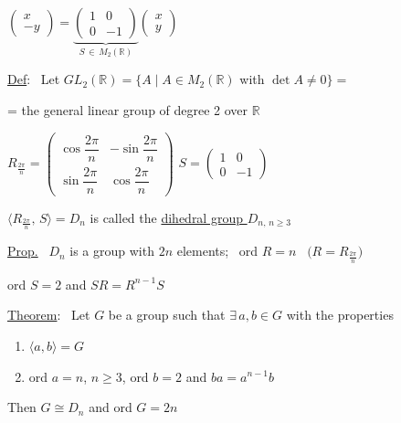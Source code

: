 \documentclass[12pt]{article}
\begin{document}
\bigskip
\noindent $\begin{pmatrix}x\\-y\end{pmatrix} = \underbrace{\begin{pmatrix}1&0\\0&-1\end{pmatrix}}_{S\,\in\, M_2(\mathbb{R})}\begin{pmatrix}x\\y\end{pmatrix}$

\bigskip
\noindent\underline{Def}: \ Let $GL_2(\mathbb{R}) = \{A \mid A\in M_2(\mathbb{R})$ with $\det A\neq 0\} =$

\noindent = the general linear group of degree 2 over $\mathbb{R}$

\bigskip
\noindent $R_{\frac{2\pi}{n}} = \begin{pmatrix}\cos\dfrac{2\pi}{n} & -\sin\dfrac{2\pi}{n}\\[6pt] \sin\dfrac{2\pi}{n} & \cos\dfrac{2\pi}{n}\end{pmatrix}$ \hfill $S=\begin{pmatrix}1&0\\0&-1\end{pmatrix}$

\bigskip
\noindent $\big\langle R_{\frac{2\pi}{n}},\,S\big\rangle = D_n$ is called the \underline{dihedral group $D_{n,\,n\geq 3}$}

\bigskip
\noindent\underline{Prop.} \ $D_n$ is a group with $2n$ elements; \ ord $R=n$ \ $\big(R=R_{\frac{2\pi}{n}}\big)$

\noindent ord $S=2$ and $SR=R^{n-1}S$

\bigskip
\bigskip
\noindent\underline{Theorem}: \ Let $G$ be a group such that $\exists\,a,b\in G$ with the properties

\begin{enumerate}
\item[1)] $\langle a,b\rangle = G$
\item[2)] ord $a=n$, $n\geq 3$, ord $b=2$ and $ba=a^{n-1}b$
\end{enumerate}

\noindent Then $G\cong D_n$ and ord $G=2n$
\end{document}
